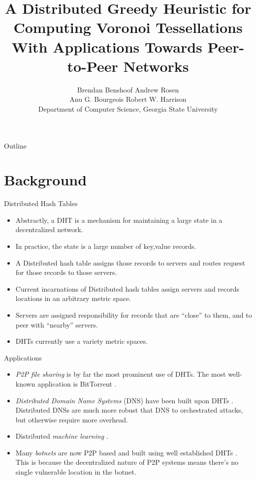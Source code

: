 \documentclass[8pt]{beamer}
\title{A Distributed Greedy Heuristic for Computing Voronoi Tessellations With Applications Towards Peer-to-Peer Networks}
\author{Brendan Benshoof \qquad Andrew Rosen \qquad \\Anu G. Bourgeois \qquad Robert W. Harrison \\Department of Computer Science, Georgia State University}
\begin{document}
	\maketitle
	
	
	
	\begin{frame}{Outline}
		\tableofcontents
	\end{frame}
	
	
	\section{Background}
	
	\begin{frame}{Distributed Hash Tables}
		\begin{itemize}
			\item Abstractly, a DHT is a mechanism for maintaining a large state in a decentralized network.
			\item In practice, the state is a large number of key,value records.
			\item A Distributed hash table assigns those records to servers and routes request for those records to those servers.
			\item Current incarnations of Distributed hash tables assign servers and records locations in an arbitrary metric space.
			\item Servers are assigned responsibility for records that are ``close'' to them, and to peer with ``nearby'' servers.
			\item DHTs currently use a variety metric spaces.
		\end{itemize}


	\end{frame}

	\begin{frame}{Applications}
		\begin{itemize}
			\item \textit{P2P file sharing} is by far the most prominent use of DHTs.  
			The most well-known application is BitTorrent \cite{bittorrent}.
			\item \textit{Distributed Domain Name Systems} (DNS) have been built upon DHTs \cite{cox2002serving} \cite{pappas2006comparative}.
			Distributed DNSs are much more robust that DNS to orchestrated attacks, but otherwise require more overhead.
			\item Distributed \textit{machine learning} \cite{liparameter}.
			\item Many \textit{botnets} are now P2P based and built using well established DHTs \cite{saad2011detecting}. 
			This is because the decentralized nature of P2P systems means there's no single vulnerable location in the botnet.
		\end{itemize}
	\end{frame}
\end{document}
